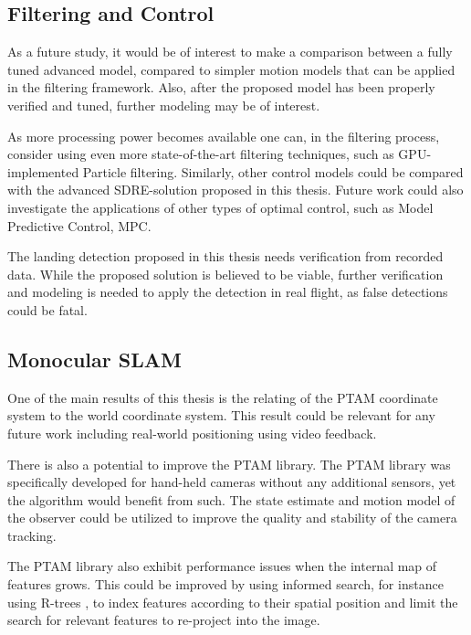     \subsection{Filtering and Control}
        As a future study, it would be of interest to make a comparison between
        a fully tuned advanced model, compared to simpler motion models that
        can be applied in the filtering framework.
        Also, after the proposed model has been properly verified and tuned, further
        modeling may be of interest.

        As more processing power becomes available one can, in the filtering
        process, consider using even more state-of-the-art filtering techniques,
        such as GPU-implemented Particle filtering.
        Similarly, other control models could be compared with the
        advanced SDRE-solution proposed in this thesis.
        Future work could also investigate the applications of other types of
        optimal control, such as Model Predictive Control, MPC.
        
        The landing detection proposed in this thesis needs verification 
        from recorded data. While the proposed solution is believed to be viable,
        further verification and modeling is needed to apply the detection
        in real flight, as false detections could be fatal.

    \subsection{Monocular SLAM}
        One of the main results of this thesis is the relating of the PTAM
        coordinate system to the world coordinate system.
        This result could be relevant for any future work including real-world
        positioning using video feedback.

        There is also a potential to improve the PTAM library.
        The PTAM library was specifically developed for hand-held cameras
        without any additional sensors, yet the algorithm would benefit
        from such. The state estimate and motion model of the
        observer could be utilized to improve the quality and stability of
        the camera tracking.

        The PTAM library also exhibit performance issues when the internal map of features
        grows. This could be improved by using informed search,
        for instance using R-trees%
        , to index features according to their spatial position and limit the search for
        relevant features to re-project into the image.
